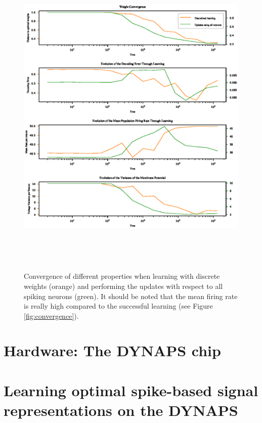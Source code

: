 \documentclass[twoside,11pt]{article}
\begin{document}
\begin{figure}[!htb]
  \includegraphics[width = \columnwidth, height=16cm]{figures/convergence_d_vs_ua.eps}
  \caption{Convergence of different properties when learning with discrete weights (orange)
  and performing the updates with respect to all spiking neurons (green).
  It should be noted that the mean firing rate is really high compared to the successful learning (see
  Figure \ref{fig:convergence}).}
  \label{fig:convergence_ua_discrete}
\end{figure}

\newpage

\section{Hardware: The DYNAPS chip} \label{sec:DYNAPS}

\section{Learning optimal spike-based signal representations on the DYNAPS}
\end{document}
